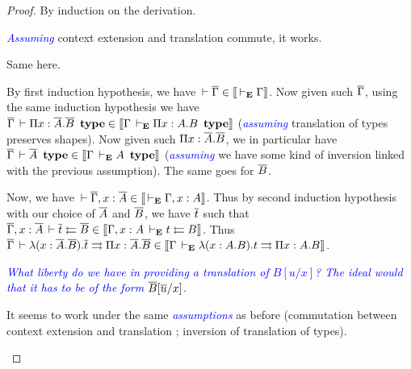 \documentclass{amsart}
\newcommand\meta[1]{\noindent\textcolor{blue}{\emph{#1}}}
\begin{document}
\begin{proof}
  By induction on the derivation.
  \begin{caselist}
    \nextcase
    \begin{mathpar}
    \end{mathpar}
    \meta{Assuming} context extension and translation commute, it works.

    \nextcase
    \begin{mathpar}
    \end{mathpar}
    Same here.

    \nextcase
    \begin{mathpar}
    \end{mathpar}
    By first induction hypothesis, we have $\der \barG \in \den{\dere \Gamma}$.
    Now given such $\barG$, using the same induction hypothesis we have
    $\barG \der \Pi x:\barA.\barB\ \type
    \in \den{\Gamma \dere \Pi x:A.B\ \type}$
    (\meta{assuming} translation of types preserves shapes).
    Now given such $\Pi x:\barA.\barB$, we in particular have
    $\barG \der \barA\ \type \in \den{\Gamma \dere A\ \type}$
    (\meta{assuming} we have some kind of inversion linked with the previous
    assumption). The same goes for $\barB$.

    Now, we have $\der \barG, x:\barA \in \den{\dere \Gamma, x:A}$.
    Thus by second induction hypothesis with our choice of $\barA$ and
    $\barB$, we have $\bart$ such that
    $\barG, x:\barA \der \bart \checks \barB \in
    \den{\Gamma, x:A \dere t \checks B}$.
    Thus $\barG \der \lambda (x:\barA.\barB).\bart \infers \Pi x:\barA.\barB
    \in \den{\Gamma \dere \lambda (x:A.B).t \infers \Pi x:A.B}$.

    \nextcase
    \begin{mathpar}
    \end{mathpar}
    \meta{What liberty do we have in providing a translation of $B[u/x]$? The
    ideal would that it has to be of the form $\barB[\baru/x]$.}

    \nextcase
    \begin{mathpar}
    \end{mathpar}
    It seems to work under the same \meta{assumptions} as before (commutation
    between context extension and translation ; inversion of translation of
    types).


\end{caselist}
\end{proof}
\end{document}
